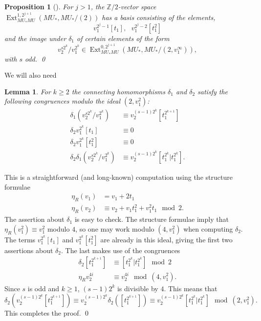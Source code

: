 \documentclass{amsart}
\newtheorem{lem}[equation]{Lemma}
\newtheorem{prop}[equation]{Proposition}
\theoremstyle{definition}
\theoremstyle{remark}
\newenvironment{pf}{\bigskip{\em Proof:\/}}{\qed\medskip}
\newcommand{\ext}{\operatorname{Ext}}
\newcommand{\Z}{{\mathbb Z}}
\newcommand{\mustarmu}{MU_{\ast}MU}
\newcommand{\mustar}{MU_{\ast}}
\begin{document}
\begin{prop}[\cite{MRW,shimomura81:_novik_rm_ext_sp2_at_prime}]
\label{thm:231} For $j>1$, the $\Z/2$-vector space
$\ext_{\mustarmu}^{1, 2^{j+1}}(\mustar, \mustar/(2))$ has a basis
consisting of the elements,
\[
v_{1}^{2^{j}-1}[t_{1}], \text{ } v_{1}^{2^{j}-2}[t_{1}^{2}]
\]
and the image under $\delta_{1}$ of certain elements of the form
\[
v_{2}^{s 2^{k}}/v_{1}^{2^{k}} \in 
\ext_{\mustarmu}^{0, 2^{j+1}}(\mustar, \mustar/(2,
v_{1}^{\infty})),
\]
with $s$ odd.  \qed
\end{prop}

We will also need

\begin{lem}
\label{thm:235} For $k\ge 2$
the connecting homomorphisms $\delta_{1}$ and $\delta_{2}$ satisfy
the following congruences modulo the ideal $(2, v_{1}^{2})$:
\begin{align*}
\delta_{1}(v_{2}^{s 2^{k}}/v_{1}^{2^{k}}) &\equiv
v_{2}^{(s-1)2^{k}}[t_{1}^{2^{k+1}}]  \\
\delta_{2}v_{1}^{2^{k}}[t_{1}] &\equiv 0 \\
\delta_{2}v_{1}^{2^{k}}[t_{1}^{2}] &\equiv 0 \\
\delta_{2}\delta_{1}(v_{2}^{s 2^{k}}/v_{1}^{2^{k}})  &\equiv
v_{2}^{(s-1)2^{k}}[t_{1}^{2^{k}}\vert t_{1}^{2^{k}}].
\end{align*}
\end{lem}

\begin{pf}
This is a straightforward (and long-known) computation using the
structure formulae
\begin{align*}
\eta_{R}(v_{1}) &= v_{1} + 2 t_{1} \\
\eta_{R}(v_{2}) &\equiv v_{2} +v_{1}t_{1}^{2} + v_{1}^{2}t_{1}\mod 2.
\end{align*}
The assertion about $\delta_{1}$ is easy to check.  The structure
formulae imply that $\eta_{R}(v_{1}^{2})\equiv v_{1}^{2}$ modulo $4$, so
one may work modulo $(4,v_{1}^{2})$ when computing $\delta_{2}$.  The
terms $v_{1}^{2^{k}}[t_{1}]$ and $v_{1}^{2^{k}}[t_{1}^{2}]$ are
already in this ideal, giving the first two assertions about
$\delta_{2}$.  The last makes use of the congruences
\begin{align*}
\delta_{2}[t_{1}^{2^{k+1}}] &\equiv [t_{1}^{2^{k}}\vert t_{1}^{2^{k}}]
\mod 2 \\
\eta_{R}v_{2}^{4i} &\equiv v_{2}^{4i} \mod (4, v_{1}^{2}).
\end{align*}
Since $s$ is odd and $k\ge 1$, $(s-1)2^{k}$ is divisible by $4$.  This
means that
\[
\delta_{2}(v_{2}^{(s-1)2^{k}}[t_{1}^{2^{k+1}}]) \equiv
v_{2}^{(s-1)2^{k}}\delta_{2}([t_{1}^{2^{k+1}}]) \equiv
v_{2}^{(s-1)2^{k}}[t_{1}^{2^{k}}\vert t_{1}^{2^{k}}]\mod (2, v_{1}^{2}).
\]
This completes the proof.
\end{pf}
\end{document}
